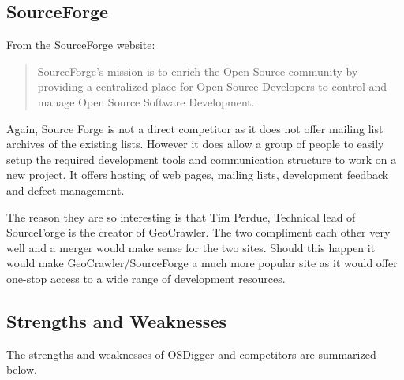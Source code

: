 \subsection{SourceForge}
From the SourceForge website:
\begin{quote}
  SourceForge's mission is to enrich the Open Source community by
  providing a centralized place for Open Source Developers to control
  and manage Open Source Software Development.
\end{quote}
Again, Source Forge is not a direct competitor as it does not offer mailing list archives of the existing lists.  However it does allow a group of people to easily setup the required development tools and communication structure to work on a new project.  It offers hosting of web pages, mailing lists, development feedback and defect management.  

The reason they are so interesting is that Tim Perdue, Technical lead of SourceForge is the creator of GeoCrawler.  The two compliment each other very well and a merger would make sense for the two sites.  Should this happen it would make GeoCrawler/SourceForge a much more popular site as it would offer one-stop access to a wide range of development resources.

\subsection{Strengths and Weaknesses}
The strengths and weaknesses of OSDigger and competitors are summarized below.

